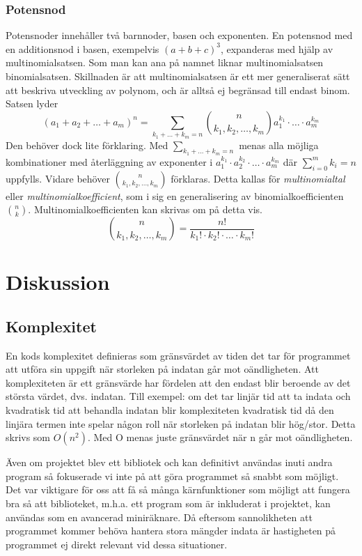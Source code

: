 \documentclass[12pt,a4paper]{article}
\begin{document}
\subsubsection{Potensnod} Potensnoder innehåller två barnnoder, basen och exponenten. En potensnod med en additionsnod i basen, exempelvis \((a+b+c)^{3}\), expanderas med hjälp av multinomialsatsen. Som man kan ana på namnet liknar multinomialsatsen binomialsatsen. Skillnaden är att multinomialsatsen är ett mer generaliserat sätt att beskriva utveckling av polynom, och är alltså ej begränsad till endast binom. Satsen lyder
\[(a_{1}+a_{2}+\ldots+a_{m})^{n}=\displaystyle\sum_{k_{1}+\dots+k_{m}=n}\binom{n}{k_{1},k_{2},\dots,k_{m}}a_{1}^{k_{1}}\cdot\ldots\cdot a_{m}^{k_{m}}\]
Den behöver dock lite förklaring. Med \(\displaystyle\sum_{k_{1}+\dots+k_{m}=n}\) menas alla möjliga kombinationer med återläggning av exponenter i \(a_{1}^{k_{1}}\cdot a_{2}^{k_{2}}\cdot\ldots\cdot a_{m}^{k_{m}}\) där \(\displaystyle\sum_{i=0}^{m}k_{i}=n\) uppfylls. Vidare behöver  \(\binom{n}{k_{1},k_{2},\ldots,k_{m}}\) förklaras. Detta kallas för \textit{multinomialtal} eller \textit{multinomialkoefficient}, som i sig en generalisering av binomialkoefficienten \(\binom{n}{k}\). Multinomialkoefficienten kan skrivas om på detta vis.
\[\binom{n}{k_{1},k_{2},\ldots,k_{m}}=\frac{n!}{k_{1}!\cdot k_{2}!\cdot\ldots\cdot k_{m}!}\]
\section{Diskussion}
\subsection{Komplexitet}
\label{subsec:Komplexitet}
En kods komplexitet definieras som gränsvärdet av tiden det tar för programmet att utföra sin uppgift när storleken på indatan går mot oändligheten. Att komplexiteten är ett gränsvärde har fördelen att den endast blir beroende av det största värdet, dvs. indatan. Till exempel: om det tar linjär tid att ta indata och kvadratisk tid att behandla indatan blir komplexiteten kvadratisk tid då den linjära termen inte spelar någon roll när storleken på indatan blir hög/stor. Detta skrivs som \(O(n^2)\). Med O menas juste gränsvärdet när n går mot oändligheten.
\par
Även om projektet blev ett bibliotek och kan definitivt användas inuti andra program så fokuserade vi inte på att göra programmet så snabbt som möjligt. Det var viktigare för oss att få så många kärnfunktioner som möjligt att fungera bra så att biblioteket, m.h.a. ett program som är inkluderat i projektet, kan användas som en avancerad miniräknare. Då eftersom sannolikheten att programmet kommer behöva hantera stora mängder indata är hastigheten på programmet ej direkt relevant vid dessa situationer. 
\end{document}
